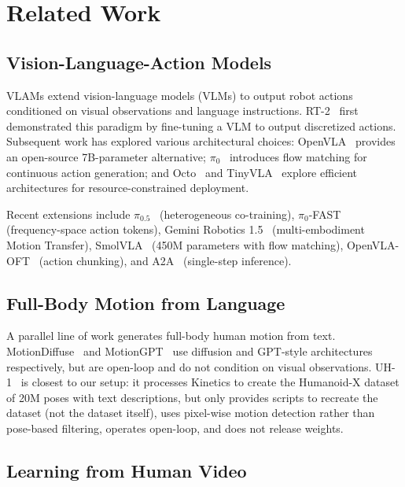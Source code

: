 \documentclass[letterpaper, 10pt, conference]{ieeeconf}
\begin{document}
\section{Related Work}

\subsection{Vision-Language-Action Models}

VLAMs extend vision-language models (VLMs) to output robot actions conditioned on visual observations and language instructions. RT-2~\cite{rt2} first demonstrated this paradigm by fine-tuning a VLM to output discretized actions. Subsequent work has explored various architectural choices: OpenVLA~\cite{openvla} provides an open-source 7B-parameter alternative; $\pi_0$~\cite{pi0} introduces flow matching for continuous action generation; and Octo~\cite{octo} and TinyVLA~\cite{tinyvla} explore efficient architectures for resource-constrained deployment.

Recent extensions include $\pi_{0.5}$~\cite{pi05} (heterogeneous co-training), $\pi_0$-FAST~\cite{pi0fast} (frequency-space action tokens), Gemini Robotics 1.5~\cite{gemini15} (multi-embodiment Motion Transfer), SmolVLA~\cite{smolvla} (450M parameters with flow matching), OpenVLA-OFT~\cite{openvla_oft} (action chunking), and A2A~\cite{a2a} (single-step inference).

\subsection{Full-Body Motion from Language}

A parallel line of work generates full-body human motion from text. MotionDiffuse~\cite{motiondiffuse} and MotionGPT~\cite{motiongpt} use diffusion and GPT-style architectures respectively, but are open-loop and do not condition on visual observations. UH-1~\cite{uh1} is closest to our setup: it processes Kinetics to create the Humanoid-X dataset of 20M poses with text descriptions, but only provides scripts to recreate the dataset (not the dataset itself), uses pixel-wise motion detection rather than pose-based filtering, operates open-loop, and does not release weights.

\subsection{Learning from Human Video}
\end{document}
